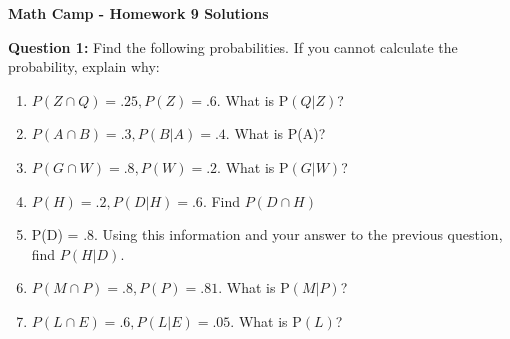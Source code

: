 \documentclass[10pt]{amsart}
\begin{document}
\centerline{\bf Math Camp - Homework 9 Solutions}



\noindent \textbf{Question 1:}
 Find the following probabilities. If you cannot calculate the probability, explain why:

\begin{enumerate} 
\item $P(Z \cap Q) = .25, P(Z) = .6$. What is P$(Q | Z)$?
\item $P(A \cap B) = .3, P(B|A) = .4$. What is P(A)?
\item $P(G \cap W) = .8, P(W) = .2$. What is P$(G | W)$?
\item $P(H) = .2, P(D | H) = .6$. Find $P(D \cap H)$
\item P(D) = .8. Using  this information and your answer to the previous question, find $P(H | D)$. 
\item $P(M \cap P) = .8, P(P) = .81$. What is P$(M | P)$?
\item  $P(L \cap E) = .6, P(L | E) = .05$. What is P$(L)$?
\end{enumerate}
\end{document}
